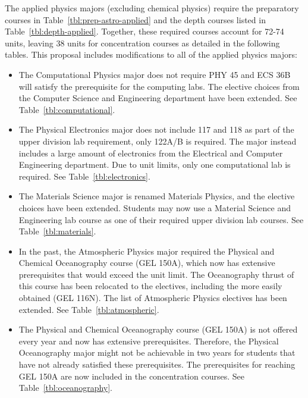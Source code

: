 \documentclass[12pt]{article}
\begin{document}
The applied physics majors (excluding chemical physics) require the
preparatory courses in Table~\ref{tbl:prep-astro-applied} and the
depth courses listed in Table~\ref{tbl:depth-applied}.  Together,
these required courses account for 72-74 units, leaving 38 units for
concentration courses as detailed in the following tables.  This
proposal includes modifications to all of the applied physics majors:
\begin{itemize}

  \item The Computational Physics major does not require PHY 45 and ECS
  36B will satisfy the prerequisite for the computing labs.  The
  elective choices from the Computer Science and Engineering
  department have been extended.  See Table~\ref{tbl:computational}.

\item The Physical Electronics major does not include 117 and 118 as
  part of the upper division lab requirement, only 122A/B is required.
  The major instead includes a large amount of electronics from the
  Electrical and Computer Engineering department.  Due to unit limits,
  only one computational lab is required.  See
  Table~\ref{tbl:electronics}.

\item The Materials Science major is renamed Materials Physics, and
  the elective choices have been extended.  Students may now use a
  Material Science and Engineering lab course as one of their required
  upper division lab courses.  See Table~\ref{tbl:materials}.

\item In the past, the Atmospheric Physics major required the Physical
  and Chemical Oceanography course (GEL 150A), which now has extensive
  prerequisites that would exceed the unit limit.  The Oceanography
  thrust of this course has been relocated to the electives, including
  the more easily obtained (GEL 116N).  The list of Atmospheric
  Physics electives has been extended.  See Table~\ref{tbl:atmospheric}.

\item The Physical and Chemical Oceanography course (GEL 150A) is not
  offered every year and now has extensive prerequisites.  Therefore,
  the Physical Oceanography major might not be achievable in two years
  for students that have not already satisfied these prerequisites.
  The prerequisites for reaching GEL 150A are now included in the
  concentration courses.  See Table~\ref{tbl:oceanography}.
  

\end{itemize}
\end{document}
